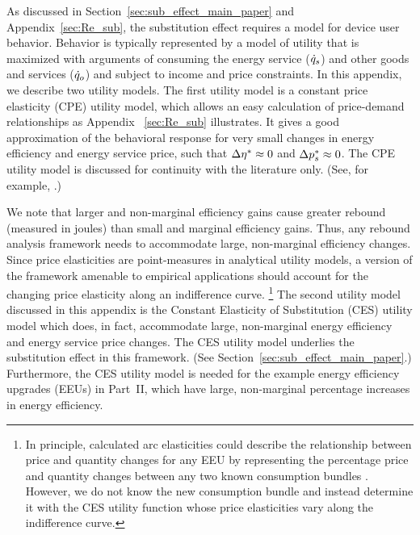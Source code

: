 \documentclass[12pt]{article}\usepackage[]{graphicx}\usepackage[]{xcolor}
\begin{document}
As discussed in Section~\ref{sec:sub_effect_main_paper}
and Appendix~\ref{sec:Re_sub}, 
the substitution effect requires a model for device user behavior.
Behavior is typically represented by a model of utility that is maximized
with arguments of consuming the energy service ($\dot{q}_s$)
and other goods and services ($\dot{q}_o$) and
subject to income and price constraints.
In this appendix, we describe two utility models.
The first utility model is a constant price elasticity (CPE) utility model,
which allows an easy calculation of price-demand relationships as Appendix
~\ref{sec:Re_sub} illustrates.
It gives a good approximation of the behavioral response
for very small changes in energy efficiency and 
energy service price, 
such that $\Delta {\eta}^* \approx 0$ and $\Delta {p}^*_s \approx 0$.
The CPE utility model 
is discussed for continuity with the literature only.
(See, for example, \citet[p. 17, footnote 43]{Borenstein:2015aa}.)

We note that larger and non-marginal efficiency gains cause greater rebound
(measured in joules)
than small and marginal efficiency gains.
Thus, any rebound analysis framework needs to accommodate 
large, non-marginal efficiency changes.
Since price elasticities are point-measures in analytical utility models,
a version of the framework amenable to empirical applications 
should account for the changing price
elasticity along an indifference curve.%
\footnote{
  In principle,
  calculated arc elasticities could describe the relationship
  between price and quantity changes for any EEU
  by representing the
  percentage price and quantity changes between any two known consumption bundles \citep{Allen1934}.
  However, we do not know the new consumption bundle
  and instead determine it with the CES utility function whose price elasticities vary
  along the indifference curve. 
}
%
The second utility model discussed in this appendix is the
Constant Elasticity of Substitution (CES)
utility model which does, in fact,
accommodate large, non-marginal 
energy efficiency and energy service price changes.
The CES utility model 
underlies the substitution effect
in this framework.
(See Section~\ref{sec:sub_effect_main_paper}.)
Furthermore,
the CES utility model is needed for 
the example energy efficiency upgrades (EEUs) in Part~II,
which have large, non-marginal
percentage increases in energy efficiency.
\end{document}
